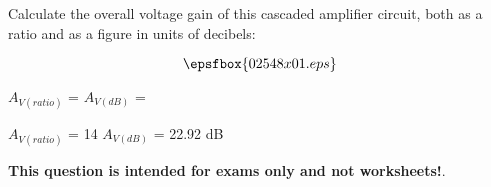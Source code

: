 

Calculate the overall voltage gain of this cascaded amplifier circuit, both as a ratio and as a figure in units of decibels:

$$\epsfbox{02548x01.eps}$$

$A_{V(ratio)}$ =  \hskip 80pt $A_{V(dB)}$ = 







$A_{V(ratio)}$ = 14 \hskip 50pt $A_{V(dB)}$ = 22.92 dB







{\bf This question is intended for exams only and not worksheets!}.




